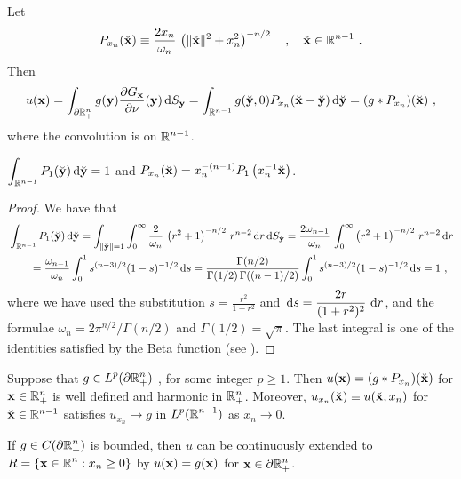 Let
\[
P_{x_n}(\breve{\mathbf{x}}) \equiv \frac{2x_n}{\omega_n}\,
\left( \|\breve{\mathbf{x}}\|^2 + x_n^2 \right)^{-n/2} \quad , \quad
\breve{\mathbf{x}}\in \mathbb{R}^{n-1} \ .
\]
Then
\[
u(\mathbf{x}) = \int_{\partial \mathbb{R}^n_+} g(\mathbf{y})
\frac{\partial{G_{\mathbf{x}}}}{\partial \mathbf{\nu}}(\mathbf{y})\,\mathrm{d}{S}_{\mathbf{y}}
= \int_{\mathbb{R}^{n-1}} g(\breve{\mathbf{y}},0)
P_{x_n}(\breve{\mathbf{x}}-\breve{\mathbf{y}})
\,\mathrm{d}{\breve{\mathbf{y}}} = (g \ast P_{x_n})(\breve{\mathbf{x}}) \ ,
\]
where the convolution is on $\displaystyle \mathbb{R}^{n-1}$.

\begin{lemma} \label{laplace_lemma_diric}
$\displaystyle
\int_{\mathbb{R}^{n-1}} P_1(\breve{\mathbf{y}}) \,\mathrm{d}{\breve{\mathbf{y}}} = 1$ and
$\displaystyle P_{x_n}(\breve{\mathbf{x}}) = x_n^{-(n-1)}
P_1\left( x_n^{-1}\breve{\mathbf{x}}\right)$.
\end{lemma}

\begin{proof}
We have that
\begin{align*}
&\int_{\mathbb{R}^{n-1}} P_1(\breve{\mathbf{y}}) \,\mathrm{d}{\breve{\mathbf{y}}}
= \int_{\|\breve{\mathbf{y}}\|=1} \int_0^\infty 
\frac{2}{\omega_n}\,\left( r^2 + 1 \right)^{-n/2}\, r^{n-2}
\,\mathrm{d}{r}\,\mathrm{d}{S}_{\breve{\mathbf{y}}}
= \frac{2\omega_{n-1}}{\omega_n}\, \int_0^\infty 
\left( r^2 + 1 \right)^{-n/2}\, r^{n-2} \,\mathrm{d}{r} \\
&\qquad = \frac{\omega_{n-1}}{\omega_n} \int_0^1 s^{(n-3)/2} (1-s)^{-1/2} \,\mathrm{d}{s} 
= \frac{\Gamma(n/2)}{\Gamma(1/2)\,\Gamma((n-1)/2)}
\int_0^1 s^{(n-3)/2} (1-s)^{-1/2} \,\mathrm{d}{s} = 1 \ ,
\end{align*}
where we have used the substitution
$\displaystyle s = \frac{r^2}{1+r^2}$ and
$\displaystyle \,\mathrm{d}{s} = \frac{2r}{(1+r^2)^2}\, \,\mathrm{d}{r}$, and the
formulae $\displaystyle \omega_n = 2\pi^{n/2}/\Gamma(n/2)$ and
$\Gamma(1/2) = \sqrt{\pi}$.
The last integral is one of the identities satisfied by the Beta
function (see \cite{FoAC}).
\end{proof}

\begin{theorem} \label{laplace_half_plane_proof}
Suppose that $\displaystyle g \in L^p(\partial \mathbb{R}^n_+)$ \footnotemark,
for some integer $p\geq 1$.  Then
$u(\mathbf{x}) = (g \ast P_{x_n})(\breve{\mathbf{x}})$ for
$\mathbf{x} \in \mathbb{R}^n_+$ is well defined and harmonic in $\mathbb{R}^n_+$.
Moreover, $u_{x_n}(\breve{\mathbf{x}}) \equiv u(\breve{\mathbf{x}}, x_n)$ for
$\breve{\mathbf{x}} \in \mathbb{R}^{n-1}$ satisfies $u_{x_n} \rightarrow g$ in
$\displaystyle L^p(\mathbb{R}^{n-1})$ as $x_n \rightarrow 0$.

If $\displaystyle g\in C(\partial \mathbb{R}^n_+)$ is bounded, then $u$ can be
continuously extended to
$\displaystyle R = \{\mathbf{x}\in \mathbb{R}^n : x_n \geq 0\}$ by
$u(\mathbf{x}) = g(\mathbf{x})$ for $\displaystyle \mathbf{x} \in \partial \mathbb{R}^n_+$.
\end{theorem}

